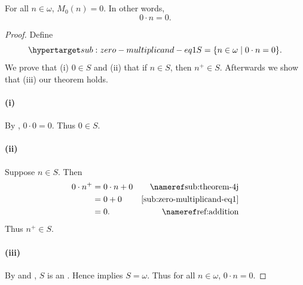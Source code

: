 \documentclass{report}
\begin{document}
\subsection{}%

\begin{lemma}

  For all $n \in \omega$, $M_0(n) = 0$.
  In other words, $$0 \cdot n = 0.$$

\end{lemma}

\begin{proof}


  Define
    \begin{equation}
      \hyperlabel{sub:zero-multiplicand-eq1}
      S = \{n \in \omega \mid 0 \cdot n = 0\}.
    \end{equation}
  We prove that (i) $0 \in S$ and (ii) that if $n \in S$, then $n^+ \in S$.
  Afterwards we show that (iii) our theorem holds.

  \paragraph{(i)}%

    By , $0 \cdot 0 = 0$.
    Thus $0 \in S$.

  \paragraph{(ii)}%

    Suppose $n \in S$.
    Then
      \begin{align*}
        0 \cdot n^+
          & = 0 \cdot n + 0 & \textref{sub:theorem-4j} \\
          & = 0 + 0 & \eqref{sub:zero-multiplicand-eq1} \\
          & = 0. & \textref{ref:addition}
      \end{align*}
    Thus $n^+ \in S$.

  \paragraph{(iii)}%

    By  and ,
      $S$ is an .
    Hence  implies $S = \omega$.
    Thus for all $n \in \omega$, $0 \cdot n = 0$.

\end{proof}
\end{document}
